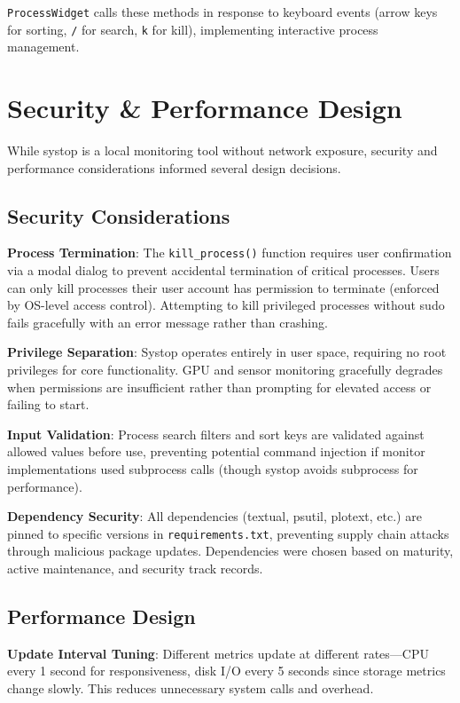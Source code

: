 \documentclass[12pt,a4paper,oneside]{report}
\begin{document}
\texttt{ProcessWidget} calls these methods in response to keyboard events (arrow keys for sorting, \texttt{/} for search, \texttt{k} for kill), implementing interactive process management.

\section{Security \& Performance Design}
\label{sec:security-performance}

While systop is a local monitoring tool without network exposure, security and performance considerations informed several design decisions.

\subsection{Security Considerations}

\textbf{Process Termination}: The \texttt{kill\_process()} function requires user confirmation via a modal dialog to prevent accidental termination of critical processes. Users can only kill processes their user account has permission to terminate (enforced by OS-level access control). Attempting to kill privileged processes without sudo fails gracefully with an error message rather than crashing.

\textbf{Privilege Separation}: Systop operates entirely in user space, requiring no root privileges for core functionality. GPU and sensor monitoring gracefully degrades when permissions are insufficient rather than prompting for elevated access or failing to start.

\textbf{Input Validation}: Process search filters and sort keys are validated against allowed values before use, preventing potential command injection if monitor implementations used subprocess calls (though systop avoids subprocess for performance).

\textbf{Dependency Security}: All dependencies (textual, psutil, plotext, etc.) are pinned to specific versions in \texttt{requirements.txt}, preventing supply chain attacks through malicious package updates. Dependencies were chosen based on maturity, active maintenance, and security track records.

\subsection{Performance Design}

\textbf{Update Interval Tuning}: Different metrics update at different rates---CPU every 1 second for responsiveness, disk I/O every 5 seconds since storage metrics change slowly. This reduces unnecessary system calls and overhead.
\end{document}
